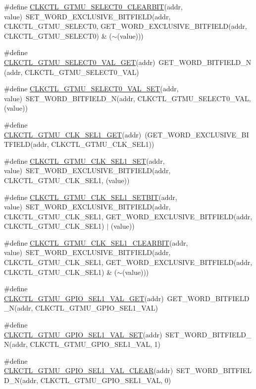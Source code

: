 \begin{DoxyCompactItemize}
\item 
\#define \hyperlink{a00544_ac08d0f918e2dc239c0ca8e50486579c1}{CLKCTL\_\-GTMU\_\-SELECT0\_\-CLEARBIT}(addr, value)~SET\_\-WORD\_\-EXCLUSIVE\_\-BITFIELD(addr, CLKCTL\_\-GTMU\_\-SELECT0, GET\_\-WORD\_\-EXCLUSIVE\_\-BITFIELD(addr, CLKCTL\_\-GTMU\_\-SELECT0) \& ($\sim$(value)))
\item 
\#define \hyperlink{a00544_a4eb8d22171d20d2ec7661c5e0def0231}{CLKCTL\_\-GTMU\_\-SELECT0\_\-VAL\_\-GET}(addr)~GET\_\-WORD\_\-BITFIELD\_\-N(addr, CLKCTL\_\-GTMU\_\-SELECT0\_\-VAL)
\item 
\#define \hyperlink{a00544_a6f1df91b2477e03c02867e0b5dea48ec}{CLKCTL\_\-GTMU\_\-SELECT0\_\-VAL\_\-SET}(addr, value)~SET\_\-WORD\_\-BITFIELD\_\-N(addr, CLKCTL\_\-GTMU\_\-SELECT0\_\-VAL, (value))
\item 
\#define \hyperlink{a00544_af17c27cdd7086b2d21cd4929f3b6f194}{CLKCTL\_\-GTMU\_\-CLK\_\-SEL1\_\-GET}(addr)~(GET\_\-WORD\_\-EXCLUSIVE\_\-BITFIELD(addr, CLKCTL\_\-GTMU\_\-CLK\_\-SEL1))
\item 
\#define \hyperlink{a00544_a40d27c9dc2df1ab40ca50b90e7b2849b}{CLKCTL\_\-GTMU\_\-CLK\_\-SEL1\_\-SET}(addr, value)~SET\_\-WORD\_\-EXCLUSIVE\_\-BITFIELD(addr, CLKCTL\_\-GTMU\_\-CLK\_\-SEL1, (value))
\item 
\#define \hyperlink{a00544_af8a83488f8d22c6e63c4b88ed445919d}{CLKCTL\_\-GTMU\_\-CLK\_\-SEL1\_\-SETBIT}(addr, value)~SET\_\-WORD\_\-EXCLUSIVE\_\-BITFIELD(addr, CLKCTL\_\-GTMU\_\-CLK\_\-SEL1, GET\_\-WORD\_\-EXCLUSIVE\_\-BITFIELD(addr, CLKCTL\_\-GTMU\_\-CLK\_\-SEL1) $|$ (value))
\item 
\#define \hyperlink{a00544_a01b3a024ea3ee3cbd04ed3ad314499b6}{CLKCTL\_\-GTMU\_\-CLK\_\-SEL1\_\-CLEARBIT}(addr, value)~SET\_\-WORD\_\-EXCLUSIVE\_\-BITFIELD(addr, CLKCTL\_\-GTMU\_\-CLK\_\-SEL1, GET\_\-WORD\_\-EXCLUSIVE\_\-BITFIELD(addr, CLKCTL\_\-GTMU\_\-CLK\_\-SEL1) \& ($\sim$(value)))
\item 
\#define \hyperlink{a00544_a6d946302e53d7c2cc46a34d4d571b6bd}{CLKCTL\_\-GTMU\_\-GPIO\_\-SEL1\_\-VAL\_\-GET}(addr)~GET\_\-WORD\_\-BITFIELD\_\-N(addr, CLKCTL\_\-GTMU\_\-GPIO\_\-SEL1\_\-VAL)
\item 
\#define \hyperlink{a00544_a1f990abe841293f25ab40f7452f082e3}{CLKCTL\_\-GTMU\_\-GPIO\_\-SEL1\_\-VAL\_\-SET}(addr)~SET\_\-WORD\_\-BITFIELD\_\-N(addr, CLKCTL\_\-GTMU\_\-GPIO\_\-SEL1\_\-VAL, 1)
\item 
\#define \hyperlink{a00544_a407f8c94a43fb0b5f3a657c7f3aff3df}{CLKCTL\_\-GTMU\_\-GPIO\_\-SEL1\_\-VAL\_\-CLEAR}(addr)~SET\_\-WORD\_\-BITFIELD\_\-N(addr, CLKCTL\_\-GTMU\_\-GPIO\_\-SEL1\_\-VAL, 0)

\end{DoxyCompactItemize}
